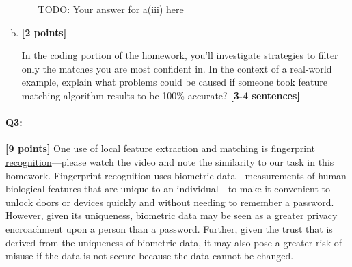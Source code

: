 \documentclass[11pt]{article}
\begin{document}
\begin{enumerate}[(a)]
\begin{enumerate}[(i)]
\begin{tcolorbox}[colback=white!5!white,colframe=green!75!black]
{{        TODO: Your answer for a(iii) here %
        
        }}
        \end{tcolorbox}
        \end{enumerate}

    \pagebreak
    \item \textbf{[2 points]} 
    \begin{tcolorbox}[colback=orange!5!white,colframe=orange!75!black]
     In the coding portion of the homework, you'll investigate strategies to filter only the matches you are most confident in. In the context of a real-world example, explain what problems could be caused if someone took feature matching algorithm results to be 100\% accurate? \textbf{[3-4 sentences]}
    \end{tcolorbox}

\end{enumerate}

\pagebreak
\paragraph{Q3:} \textbf{[9 points]} One use of local feature extraction and matching is \href{https://www.youtube.com/watch?v=xD88Qs_DZp4}{fingerprint recognition}---please watch the video and note the similarity to our task in this homework. Fingerprint recognition uses biometric data---measurements of human biological features that are unique to an individual---to make it convenient to unlock doors or devices quickly and without needing to remember a password. However, given its uniqueness, biometric data may be seen as a greater privacy encroachment upon a person than a password. Further, given the trust that is derived from the uniqueness of biometric data, it may also pose a greater risk of misuse if the data is not secure because the data cannot be changed.
\end{document}
